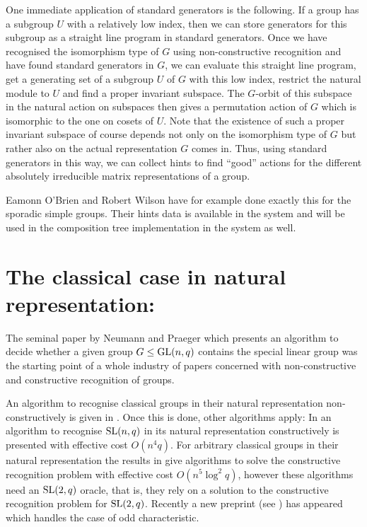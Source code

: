 \begin{App}
\label{hintsstabchains}
One immediate application of standard generators is the following. If
a group has a subgroup $U$ with a relatively low index, then we can store
generators for this subgroup as a straight line program in standard
generators. Once we have recognised the isomorphism type of $G$
using non-constructive recognition and have found standard generators
in $G$, we can evaluate this straight line program, get a
generating set of a subgroup $U$ of $G$ with this low index, restrict
the natural module to $U$ and find a proper invariant subspace. The
$G$-orbit of this subspace in the natural action on subspaces then
gives a permutation action of $G$ which is isomorphic to the one on
cosets of $U$. Note that the existence of such a proper invariant subspace 
of course depends not only on the isomorphism type of $G$ but rather
also on the actual representation $G$ comes in.
Thus, using standard generators in this way, we can collect hints
to find ``good'' actions for the different absolutely irreducible
matrix representations of a group.

Eamonn O'Brien and Robert Wilson have for example done exactly this
for the sporadic simple groups. Their hints data is available in the
{\MAGMA} system and will be used in the composition tree
implementation in the {\GAP} system as well.
\end{App}

\section{The classical case in natural representation: }
\label{solveD8}

The seminal paper by Neumann and Praeger \cite{neumann-praeger} which
presents an algorithm to decide whether a given group $G \le \GL(n,q)$
contains the special linear group was the starting point of a whole
industry of papers concerned with non-constructive and constructive
recognition of groups.

An algorithm to recognise classical groups in their
natural representation non-constructively is given in
\cite{classicalnonconstructive}. Once this is done, other algorithms
apply: In \cite{slrecogconstr} an algorithm to recognise $\SL(n,q)$
in its natural representation constructively is presented with
effective cost $O(n^4q)$. For arbitrary classical groups in their
natural representation the results in \cite{peteconstructiveclassical}
give algorithms to solve the constructive recognition problem with
effective cost $O(n^5 \log^2 q)$, however these algorithms need an
$\SL(2,q)$ oracle, that is, they rely on a solution to the constructive
recognition problem for $\SL(2,q)$. Recently a new preprint (see
\cite{recogclassicalodd}) has appeared which handles the case of odd
characteristic.

